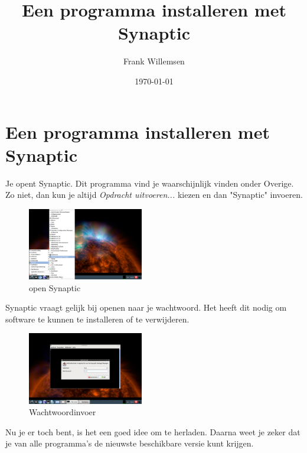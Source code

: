 \documentclass[12pt,a4paper]{article}
\begin{document}
\graphicspath{{images/}}
\lstset{language=bash}
\author{Frank Willemsen}
\title{Een programma installeren met Synaptic}
\date{\today}
\maketitle
{}
\section{Een programma installeren met Synaptic}


Je opent Synaptic. Dit programma vind je waarschijnlijk vinden onder Overige. Zo niet, dan kun je altijd \emph{Opdracht uitvoeren...} kiezen en dan "Synaptic" invoeren. 

\begin{figure} [H]
\centering
\includegraphics[width=0.45\textwidth]{plaatje01}
\caption{open Synaptic}
\label{plaatje01}
\end{figure}

Synaptic vraagt gelijk bij openen naar je wachtwoord. Het heeft dit nodig om software te kunnen te installeren of te verwijderen.

\begin{figure} [H]
\centering
\includegraphics[width=0.45\textwidth]{plaatje02}
\caption{Wachtwoordinvoer}
\label{plaatje02}
\end{figure}

\clearpage

Nu je er toch bent, is het een goed idee om te herladen. Daarna weet je zeker dat je van alle programma's de nieuwste beschikbare versie kunt krijgen.
\end{document}

